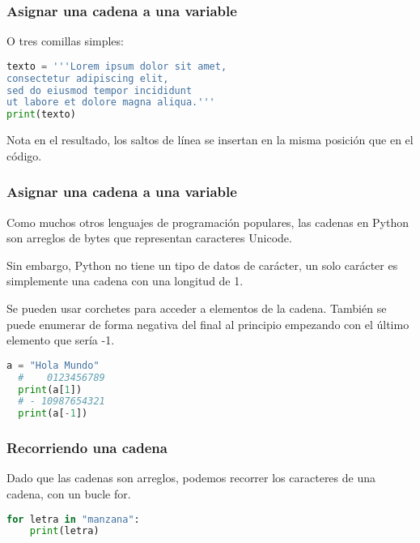 \begin{frame}[fragile]
  \frametitle{Asignar una cadena a una variable}

  O tres comillas simples:

  \begin{lstlisting}[language=Python]
texto = '''Lorem ipsum dolor sit amet,
consectetur adipiscing elit,
sed do eiusmod tempor incididunt
ut labore et dolore magna aliqua.'''
print(texto)
  \end{lstlisting}

  \begin{alertblock}{Nota}
    en el resultado, los saltos de línea se insertan en la misma
    posición que en el código.
  \end{alertblock}
\end{frame}

\begin{frame}[fragile]
  \frametitle{Asignar una cadena a una variable}

  Como muchos otros lenguajes de programación populares, las cadenas
  en Python son arreglos de bytes que representan caracteres Unicode.

  \vspace{\baselineskip}
  Sin embargo, Python no tiene un tipo de datos de carácter, un solo
  carácter es simplemente una cadena con una longitud de 1.

  \vspace{\baselineskip}
  Se pueden usar corchetes para acceder a elementos de la cadena. También
  se puede enumerar de forma negativa del final al principio empezando con
  el último elemento que sería -1.

  \begin{lstlisting}[language=Python]
  a = "Hola Mundo"
  #    0123456789
  print(a[1])
  # - 10987654321
  print(a[-1])\end{lstlisting}
\end{frame}

\begin{frame}[fragile]
  \frametitle{Recorriendo una cadena}

  Dado que las cadenas son arreglos, podemos recorrer los caracteres
  de una cadena, con un bucle \textcolor{codeKeyword}{for}.

  \vspace{\baselineskip}
  \begin{lstlisting}[language=Python]
  for letra in "manzana":
    print(letra)
  \end{lstlisting}
\end{frame}


